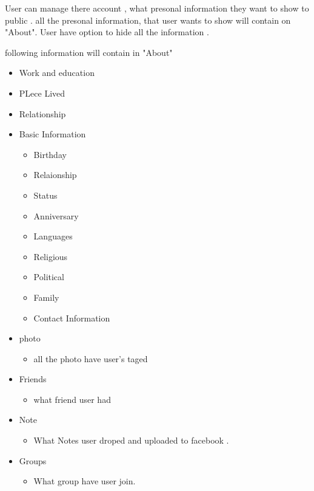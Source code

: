 User can manage there account , what presonal information they want to show to
public .
all the presonal information,  that user wants to show will contain on "About".
User have option to hide all the information .

following information will contain in "About"

\begin{itemize}

\item Work and education

\item PLece Lived

\item Relationship

\item Basic Information
    \begin{itemize}
        \item Birthday
        \item Relaionship
        \item Status
        \item Anniversary
        \item Languages
        \item Religious
        \item Political
        \item Family
        \item Contact Information
    \end{itemize}

\item photo 
    \begin{itemize}
    \item all the photo have user's taged 
    \end{itemize}

\item Friends
    \begin{itemize}
    \item what friend user had
    \end{itemize}

\item Note
    \begin{itemize}
    \item What Notes user droped and uploaded to facebook .
    \end{itemize}

\item Groups
    \begin{itemize}
    \item What group have user join.
    \end{itemize}


\end{itemize}
